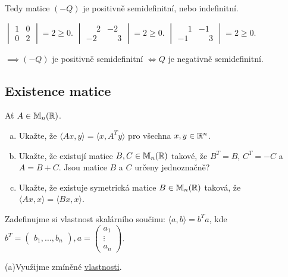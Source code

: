 Tedy matice $(-Q)$ je positivně semidefinitní, nebo indefinitní.

$\begin{vmatrix}
    1 & 0 \\
    0 & 2
\end{vmatrix} = 2 \geq 0$.
$\begin{vmatrix}
    \phantom{-}2 & -2 \\
    -2 & \phantom{-}3
\end{vmatrix} = 2 \geq 0$.
$\begin{vmatrix}
    \phantom{-}1 & -1 \\
    -1 & \phantom{-}3
\end{vmatrix} = 2 \geq 0$.

$\implies (-Q)$ je positivně semidefinitní $\iff Q$ je negativně semidefinitní.


\subsection{Existence matice}
Ať $A \in \mathbb{M}_n (\mathbb{R})$.
\begin{enumerate}[(a)]
    \item Ukažte, že $\langle Ax, y \rangle = \langle x, A^T y \rangle$ pro všechna $x, y \in \mathbb{R}^n$.
    \item Ukažte, že existují matice $B, C \in \mathbb{M}_n (\mathbb{R})$ takové, že $B^T = B$, $C^T = -C$ a $A = B + C$. Jsou
    matice $B$ a $C$ určeny jednoznačně?
    \item Ukažte, že existuje symetrická matice $B \in \mathbb{M}_n (\mathbb{R})$ taková, že $\langle Ax, x \rangle =
    \langle Bx, x \rangle$.
\end{enumerate}

Zadefinujme si vlastnost skalárního součinu: $\langle a, b\rangle = b^T a$, kde $b^T = 
\begin{pmatrix}
    b_1, \dots, b_n
\end{pmatrix}, a = 
\begin{pmatrix}
    a_1 \\
    \vdots \\
    a_n
\end{pmatrix}$. \label{skalVlastnost}

(a)Využijme zmíněné \hyperref[skalVlastnost]{vlastnosti}. \label{aExistence}

